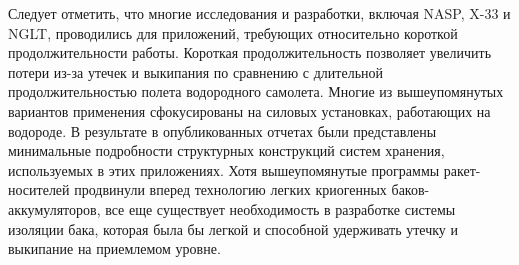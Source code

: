 Следует отметить, что многие исследования и разработки, включая NASP, X-33 и NGLT, проводились для приложений, требующих относительно короткой продолжительности работы. Короткая продолжительность позволяет увеличить потери из-за утечек и выкипания по сравнению с длительной продолжительностью полета водородного самолета. Многие из вышеупомянутых вариантов применения сфокусированы на силовых установках, работающих на водороде. В результате в опубликованных отчетах были представлены минимальные подробности структурных конструкций систем хранения, используемых в этих приложениях. Хотя вышеупомянутые программы ракет-носителей продвинули вперед технологию легких криогенных баков-аккумуляторов, все еще существует необходимость в разработке системы изоляции бака, которая была бы легкой и способной удерживать утечку и выкипание на приемлемом уровне. 
